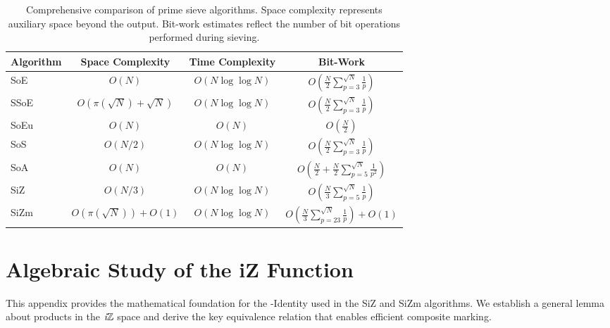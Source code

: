 \documentclass{article}
\begin{document}
\begin{table}[H]
    \centering
    \renewcommand{\arraystretch}{2}
    \begin{tabular}{l|c|c|c}
        \hline
        \textbf{Algorithm} & \textbf{Space Complexity} & \textbf{Time Complexity} & \textbf{Bit-Work} \\
        \hline
        SoE & $O(N)$ & $O(N \log \log N)$ & $O\left(\frac{N}{2}\sum_{p=3}^{\sqrt N}\frac{1}{p}\right)$ \\
        SSoE & $O(\pi(\sqrt{N}) + \sqrt{N})$ & $O(N \log \log N)$ & $O\left(\frac{N}{2}\sum_{p=3}^{\sqrt N}\frac{1}{p}\right)$ \\
        SoEu & $O(N)$ & $O(N)$ & $O\left(\frac{N}{2}\right)$ \\
        SoS & $O(N/2)$ & $O(N \log \log N)$ & $O\left(\frac{N}{2}\sum_{p=3}^{\sqrt N}\frac{1}{p}\right)$ \\
        SoA & $O(N)$ & $O(N)$ & $O\left(\frac{N}{2} + \frac{N}{2}\sum_{p=5}^{\sqrt N}\frac{1}{p^2}\right)$ \\
        SiZ & $O(N/3)$ & $O(N \log \log N)$ & $O\left(\frac{N}{3}\sum_{p=5}^{\sqrt N}\frac{1}{p}\right)$ \\
        SiZm & $O(\pi(\sqrt{N})) + O(1)$ & $O(N \log \log N)$ & $O\left(\frac{N}{3}\sum_{p=23}^{\sqrt N}\frac{1}{p}\right) + O(1)$ \\
        \hline
    \end{tabular}
    \caption{Comprehensive comparison of prime sieve algorithms. Space complexity represents auxiliary space beyond the output. Bit-work estimates reflect the number of bit operations performed during sieving.}
    \label{tab:prime_sieves_summary}
\end{table}

\newpage
\appendix

\section{Algebraic Study of the iZ Function} \label{appendix:iz_lemma}

This appendix provides the mathematical foundation for the \Xp-Identity used in the SiZ and SiZm algorithms. We establish a general lemma about products in the $\textit{i}\mathbb{Z}$ space and derive the key equivalence relation that enables efficient composite marking.
\end{document}
